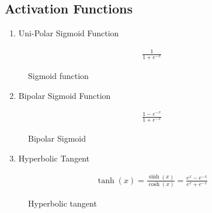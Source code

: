 \documentclass[letterpaper,12pt,english]{sphinxmanual}
\begin{document}
\subsection{Activation Functions}
\label{\detokenize{artificial-neural-network/ann:activation-functions}}\begin{enumerate}
\item {} 
Uni-Polar Sigmoid Function

\end{enumerate}
\begin{equation*}
\begin{split}\frac{1}{1+e^{-x}}\end{split}
\end{equation*}\begin{figure}[htbp]
\centering
\capstart

\noindent{}
\caption{Sigmoid function}\label{\detokenize{artificial-neural-network/ann:id3}}\end{figure}
\begin{enumerate}
\setcounter{enumi}{1}
\item {} 
Bipolar Sigmoid Function

\end{enumerate}
\begin{equation*}
\begin{split}\frac{1-e^{-x}}{1+e^{-x}}\end{split}
\end{equation*}\begin{figure}[htbp]
\centering
\capstart

\noindent{}
\caption{Bipolar Sigmoid}\label{\detokenize{artificial-neural-network/ann:id4}}\end{figure}
\begin{enumerate}
\setcounter{enumi}{2}
\item {} 
Hyperbolic Tangent

\end{enumerate}
\begin{equation*}
\begin{split}\tanh(x) = \frac{\sinh(x)}{\cosh(x)} = \frac{e^{x} - e^{-x}}{e^x + e^{-x}}\end{split}
\end{equation*}\begin{figure}[htbp]
\centering
\capstart

\noindent{}
\caption{Hyperbolic tangent}\label{\detokenize{artificial-neural-network/ann:id5}}\end{figure}
\end{document}
